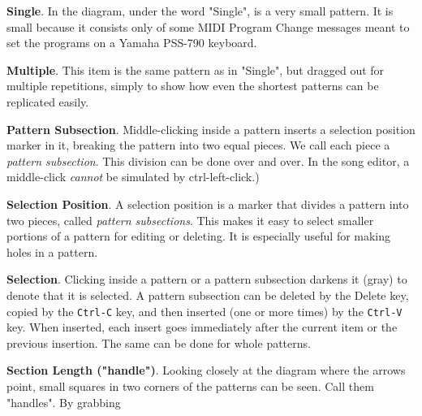    \begin{enumber}
      \item \textbf{Single}.
         In the diagram, under the word "Single", is a very small pattern.
         It is small because it consists only of some MIDI Program Change
         messages meant to set the programs on a Yamaha PSS-790 keyboard.
      \item \textbf{Multiple}.
         This item is the same pattern as in "Single", but dragged out for
         multiple repetitions, simply to show how even the shortest patterns
         can be replicated easily.
      \item \textbf{Pattern Subsection}.
         Middle-clicking inside a pattern inserts a selection position
         marker in it, breaking the pattern into two equal pieces.
         We call each piece a \textsl{pattern subsection}.
         This division can be done over and over.
         In the song editor, a middle-click
          \textsl{cannot} be simulated by ctrl-left-click.)
      \item \textbf{Selection Position}.
         A selection position is a marker that divides a pattern into two
         pieces, called \textsl{pattern subsections}.  This makes it easy to
         select smaller portions of a pattern for editing or deleting.  It
         is especially useful for making holes in a pattern.
      \item \textbf{Selection}.
         Clicking inside a pattern or a pattern subsection darkens it
         (gray) to denote that it is selected.
         A pattern subsection can be deleted by the
         Delete key, copied by the
         \texttt{Ctrl-C} key, and then inserted (one or more times) by the
         \texttt{Ctrl-V} key.  When inserted, each insert goes immediately
         after the current item or the previous insertion.  The same can be
         done for whole patterns.
      \item \textbf{Section Length ("handle")}.
         Looking closely at the diagram where the arrows point, small
         squares in two corners of the patterns can be seen.
         Call them "handles".
         By grabbing

\end{enumber}
